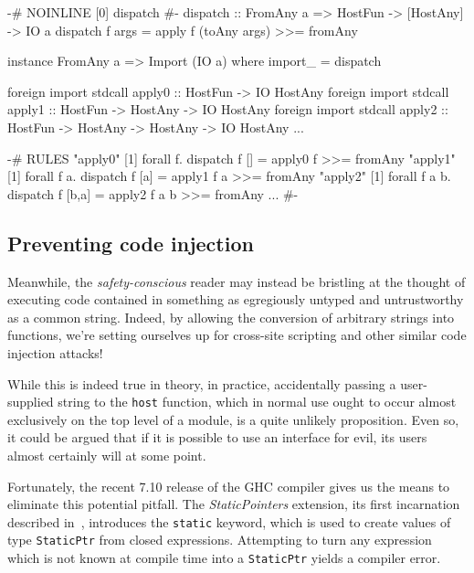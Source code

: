 \documentclass[preprint]{sigplanconf}
\begin{document}
\begin{listingfloat}
\begin{code}
{-# NOINLINE [0] dispatch #-}
dispatch :: FromAny a => HostFun -> [HostAny] -> IO a
dispatch f args = apply f (toAny args) >>= fromAny

instance FromAny a => Import (IO a) where
  import_ = dispatch

foreign import stdcall apply0 ::
  HostFun -> IO HostAny
foreign import stdcall apply1 ::
  HostFun -> HostAny -> IO HostAny
foreign import stdcall apply2 ::
  HostFun -> HostAny -> HostAny -> IO HostAny
...

{-# RULES
"apply0" [1] forall f. dispatch f [] =
               apply0 f >>= fromAny
"apply1" [1] forall f a. dispatch f [a] =
               apply1 f a >>= fromAny
"apply2" [1] forall f a b. dispatch f [b,a] =
               apply2 f a b >>= fromAny
...
 #-}
\end{code}
\caption{Specializing the \lstinline!host! base case}
\label{lst:specialization}
\end{listingfloat}

\subsection{Preventing code injection}
\label{sec:safe_host}
Meanwhile, the \emph{safety-conscious} reader may instead be bristling at the
thought of executing code contained in something as egregiously untyped and
untrustworthy as a common string.
Indeed, by allowing the conversion of arbitrary strings
into functions, we're setting ourselves up for cross-site scripting and other
similar code injection attacks!

While this is indeed true in theory, in practice, accidentally passing a
user-supplied string to the \lstinline!host! function, which in normal use
ought to occur almost exclusively on the top level of a module, is a quite
unlikely proposition. Even so, it could be argued that if it is possible to use
an interface for evil, its users almost certainly will at some point.

Fortunately, the recent 7.10 release of the GHC compiler gives us the means to
eliminate this potential pitfall. The \emph{StaticPointers} extension, its
first incarnation described in\ \cite{cloudhaskell}, introduces the
\lstinline!static! keyword, which is used to create values of type
\lstinline!StaticPtr! from closed expressions. Attempting to turn any
expression which is not known at compile time into a \lstinline!StaticPtr!
yields a compiler error.
\end{document}
